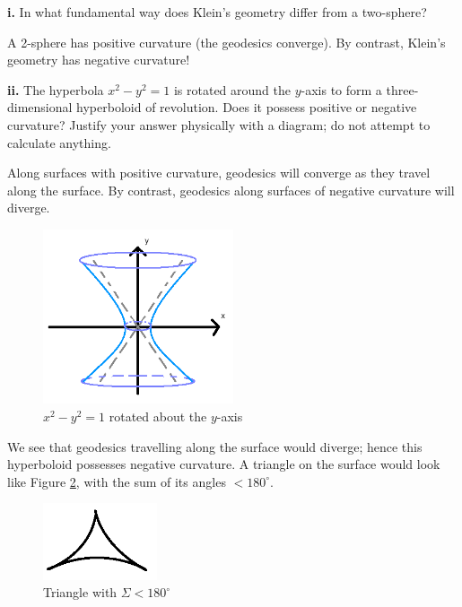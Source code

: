 \documentclass[a4paper]{article} %
\begin{document}
\begin{framed}
\textbf{i.} In what fundamental way does Klein's geometry differ from a two-sphere?
\end{framed}

A 2-sphere has positive curvature (the geodesics converge). By contrast, Klein's geometry has negative curvature!


\begin{framed}
\textbf{ii.} The hyperbola $x^2-y^2=1$ is rotated around the $y$-axis to form a three-dimensional hyperboloid of revolution. Does it possess positive or negative curvature? Justify your answer physically with a diagram; do not attempt to calculate anything.
\end{framed}

Along surfaces with positive curvature, geodesics will converge as they travel along the surface. By contrast, geodesics along surfaces of negative curvature will diverge.

\begin{figure}[h]
\centering
\includegraphics[width=0.5\textwidth]{images/dii.png}
\caption{$x^2-y^2=1$ rotated about the $y$-axis}
\label{dii figure}
\end{figure}

We see that geodesics travelling along the surface would diverge; hence this hyperboloid possesses negative curvature. A triangle on the surface would look like Figure \ref{neg curv triangle}, with the sum of its angles $< 180^{\circ}$.

\begin{figure}[h]
\centering
\includegraphics[width=0.3\textwidth]{images/negativeCurvTriangle.png}
\caption{Triangle with $\Sigma<180^{\circ}$}
\label{neg curv triangle}
\end{figure}
\end{document}
